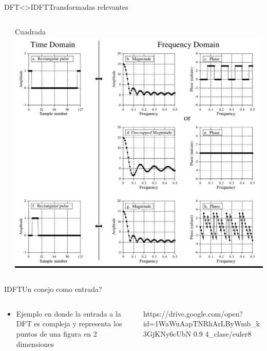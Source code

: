 \begin{frame}{DFT<>IDFT}{Transformadas relevantes}
\begin{columns}[c]
\begin{column}{.33\textwidth}
      \end{column}
      \begin{column}{.33\textwidth}
         Cuadrada
         \centering\includegraphics[width=1.0\textwidth]{4_clase/equivalencias_cuadrada}
      \end{column}
   \end{columns}
   \vfill
\end{frame}
\begin{frame}{IDFT}{Un conejo como entrada?}
   \handsonicon
   \begin{columns}[c]
      \hspace{2pt}
      \begin{column}{.4\textwidth}
         \begin{itemize}
            \item{Ejemplo en donde la entrada a la DFT es compleja y representa los puntos de una figura en 2 dimensiones}
         \end{itemize}
      \end{column}
      \hspace{2pt}
      \vrule
      \hspace{2pt}
      \begin{column}{.6\textwidth}
         {https://drive.google.com/open?id=1WaWuAapTNRhArLByWmb_k3GjKNy6cUbN}
         {0.9}
         {4_clase/euler8}
      \end{column}
      \hspace{2pt}
   \end{columns}
   \vfill
\end{frame}
